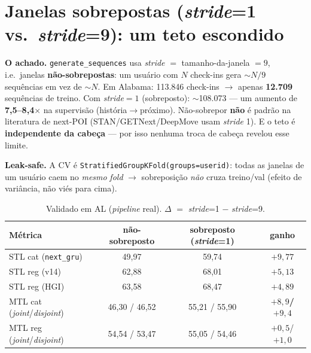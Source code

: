 \documentclass[11pt,a4paper]{article}
\newcommand{\good}[1]{\textcolor{green!45!black}{\textbf{#1}}}
\begin{document}
\section{Janelas sobrepostas (\textit{stride}=1 vs.\ \textit{stride}=9): um teto escondido}

\textbf{O achado.} \texttt{generate\_sequences} usa \textit{stride} $=$ tamanho-da-janela $=9$, i.e.\
janelas \textbf{não-sobrepostas}: um usuário com $N$ check-ins gera $\sim N/9$ sequências em vez de
$\sim N$. Em Alabama: 113.846 check-ins $\to$ apenas \textbf{12.709} sequências de treino. Com
\textit{stride}$=1$ (sobreposto): $\sim$108.073 --- um aumento de \textbf{7,5--8,4$\times$} na
supervisão (história$\to$próximo). Não-sobrepor \textbf{não} é padrão na literatura de next-POI
(STAN/GETNext/DeepMove usam \textit{stride} 1). E o teto é \textbf{independente da cabeça} --- por
isso nenhuma troca de cabeça revelou esse limite.

\textbf{Leak-safe.} A CV é \texttt{StratifiedGroupKFold(groups=userid)}: todas as janelas de um
usuário caem no \emph{mesmo} \textit{fold} $\to$ sobreposição \emph{não} cruza treino/val (efeito de
variância, não viés para cima).

\begin{table}[H]
\centering
\footnotesize
\caption{Validado em AL (\textit{pipeline} real). $\Delta$ $=$ \textit{stride}=1 $-$ \textit{stride}=9.}
\begin{tabular}{lccc}
\toprule
\textbf{Métrica} & \textbf{não-sobreposto} & \textbf{sobreposto (\textit{stride}=1)} & \textbf{ganho} \\
\midrule
STL cat (\texttt{next\_gru}) & 49,97 & 59,74 & \good{$+9,77$} \\
STL reg (v14) & 62,88 & 68,01 & \good{$+5,13$} \\
STL reg (HGI) & 63,58 & 68,47 & \good{$+4,89$} \\
MTL cat (\textit{joint}/\textit{disjoint}) & 46,30 / 46,52 & 55,21 / 55,90 & \good{$+8,9$/$+9,4$} \\
MTL reg (\textit{joint}/\textit{disjoint}) & 54,54 / 53,47 & 55,05 / 54,46 & $+0,5$/$+1,0$ \\
\bottomrule
\end{tabular}
\end{table}
\end{document}
